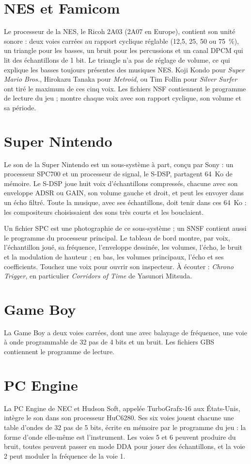 \section{NES et Famicom}
Le processeur de la NES, le Ricoh 2A03 (2A07 en Europe), contient son unité sonore : deux voies carrées au rapport
cyclique réglable (12,5, 25, 50 ou 75~\%), un triangle pour les basses, un bruit pour les percussions et un canal DPCM
qui lit des échantillons de 1 bit. Le triangle n'a pas de réglage de volume, ce qui explique les basses toujours
présentes des musiques NES. Koji Kondo pour \emph{Super Mario Bros.}, Hirokazu Tanaka pour \emph{Metroid}, ou Tim
Follin pour \emph{Silver Surfer} ont tiré le maximum de ces cinq voix. Les fichiers NSF contiennent le programme de
lecture du jeu ; \soft montre chaque voix avec son rapport cyclique, son volume et sa période.

\section{Super Nintendo}
Le son de la Super Nintendo est un sous-système à part, conçu par Sony : un processeur SPC700 et un processeur de
signal, le S-DSP, partagent 64~Ko de mémoire. Le S-DSP joue huit voix d'échantillons compressés, chacune avec son
enveloppe ADSR ou GAIN, son volume gauche et droit, et peut les envoyer dans un écho filtré. Toute la musique, avec ses
échantillons, doit tenir dans ces 64~Ko : les compositeurs choisissaient des sons très courts et les bouclaient.

Un fichier SPC est une photographie de ce sous-système ; un SNSF contient aussi le programme du processeur principal.
Le tableau de bord montre, par voix, l'échantillon joué, sa fréquence, l'enveloppe dessinée, les volumes, l'écho, le
bruit et la modulation de hauteur ; en bas, les volumes principaux, l'écho et ses coefficients. Touchez une voix pour
ouvrir son inspecteur. À écouter : \emph{Chrono Trigger}, en particulier \emph{Corridors of Time} de Yasunori
Mitsuda.

\section{Game Boy}
La Game Boy a deux voies carrées, dont une avec balayage de fréquence, une voie à onde programmable de 32 pas de
4 bits et un bruit. Les fichiers GBS contiennent le programme de lecture.

\section{PC Engine}
La PC Engine de NEC et Hudson Soft, appelée TurboGrafx-16 aux États-Unis, intègre le son dans son processeur
HuC6280. Ses six voies jouent chacune une table d'ondes de 32 pas de 5 bits, écrite en mémoire par le programme du
jeu : la forme d'onde elle-même est l'instrument. Les voies 5 et 6 peuvent produire du bruit, toutes peuvent passer en
mode DDA pour jouer des échantillons, et la voie 2 peut moduler la fréquence de la voie 1.

